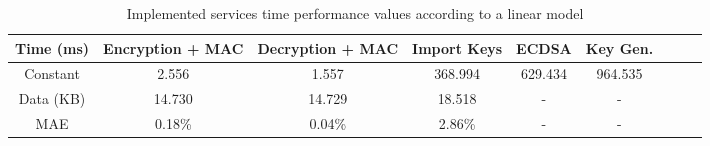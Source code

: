 \begin{table}[h!]
\centering
\def\arraystretch{1.5}
\begin{tabular}{|c|c|c|c|c|c|c|c|c|}
\hline
	Time (ms) & Encryption + MAC & Decryption + MAC & Import Keys & ECDSA & Key Gen. \\ \hline
	Constant  & 2.556  & 1.557   & 368.994 & 629.434 & 964.535 \\ \hline
	Data (KB) & 14.730  & 14.729  & 18.518  & - & - \\ \hline
	MAE	  & 0.18\% & 0.04\%  & 2.86\%  & - & - \\ \hline
\end{tabular}
\caption{Implemented services time performance values according to a linear model}
\label{tab:services-model}
\end{table}
